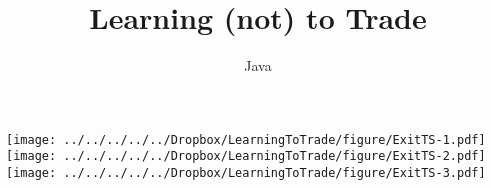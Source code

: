 \documentclass[]{article}
\title{Learning (not) to Trade}
\author{Java}
\date{}
\begin{document}
\maketitle

\texttt{[image: ../../../../../Dropbox/LearningToTrade/figure/ExitTS-1.pdf]}
\texttt{[image: ../../../../../Dropbox/LearningToTrade/figure/ExitTS-2.pdf]}
\texttt{[image: ../../../../../Dropbox/LearningToTrade/figure/ExitTS-3.pdf]}
\end{document}
